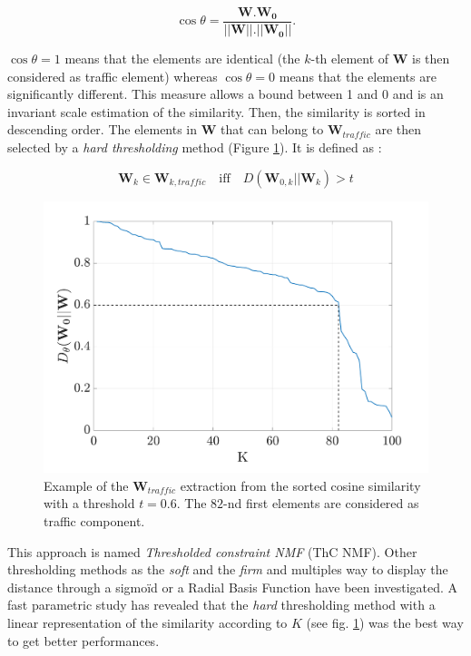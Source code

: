 \documentclass[twocolumn,a4paper,10pt]{article}
\begin{document}
\begin{equation}
\cos \theta = \frac{\mathbf{W}.\mathbf{W_0}}{\vert \vert \mathbf{W}  \vert \vert . \vert \vert \mathbf{W_0} \vert \vert}.
\end{equation}

$\cos \theta = 1$ means that the elements are identical (the $k$-th element of $\mathbf{W}$ is then considered as traffic element) whereas $\cos \theta = 0$ means that the elements are significantly different. This measure allows a bound between 1 and 0 and is an invariant scale estimation of the similarity. Then, the similarity is sorted in descending order. The elements in $\mathbf{W}$ that can belong to $\mathbf{W}_{traffic}$ are then selected by a \textit{hard thresholding} method (Figure \ref{fig:W_ThC_NMF}). It is defined as :

\begin{equation}
\mathbf{W}_k \in \mathbf{W}_{k,traffic} \quad \text{iff} \quad D\left(\mathbf{W}_{0,k} \vert \vert \mathbf{W}_{k} \right) > t
\end{equation}

\begin{figure}[hbtp]
\centering
\includegraphics[width=0.8\linewidth]{../image/distanceCosLinDisplay.pdf}
\caption{Example of the $\mathbf{W}_{traffic}$ extraction from the sorted cosine similarity with a threshold $t = 0.6$. The $82$-nd first elements are considered as traffic component.}
\label{fig:W_ThC_NMF}
\end{figure}

This approach is named \textit{Thresholded constraint NMF} (ThC NMF). Other thresholding methods as the \textit{soft} \cite{donoho1995noising}and the \textit{firm} \cite{fornasier2008iterative} and multiples way to display the distance through a sigmoïd or a Radial Basis Function have been investigated. A fast parametric study has revealed that the \textit{hard} thresholding method  with a linear representation of the similarity according to $K$ (see fig. \ref{fig:W_ThC_NMF}) was the best way to get better performances. 
\end{document}
